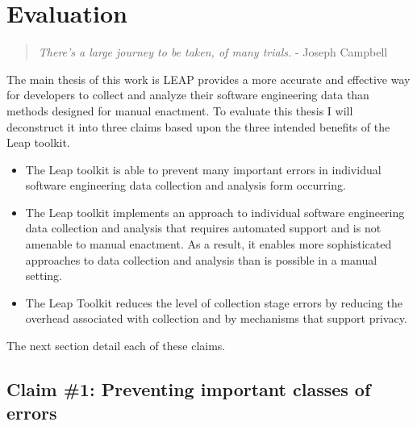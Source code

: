 
\chapter{Evaluation}
\label{sec:evaluation}
\begin{quote}
  {\em There's a large journey to be taken, of many trials. } - Joseph Campbell
\end{quote}

The main thesis of this work is LEAP provides a more accurate and
effective way for developers to collect and analyze their software engineering
data than methods designed for manual enactment. To evaluate this thesis I will
deconstruct it into three claims based upon the three intended benefits of the
Leap toolkit.

\begin{itemize}
\item{The Leap toolkit is able to prevent many important errors in individual
    software engineering data collection and analysis form occurring.}
\item{The Leap toolkit implements an approach to individual software
    engineering data collection and analysis that requires automated support
    and is not amenable to manual enactment. As a result, it enables more
    sophisticated approaches to data collection and analysis than is possible
    in a manual setting.}
\item{The Leap Toolkit reduces the level of collection stage errors by reducing
    the overhead associated with collection and by mechanisms that support
    privacy.}
\end{itemize}

The next section detail each of these claims.

\section{Claim \#1: Preventing important classes of errors}

